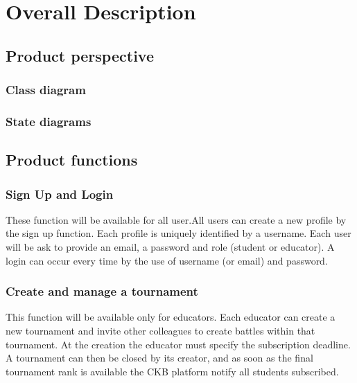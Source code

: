 \chapter{Overall Description}

\section{Product perspective}


\subsection{Class diagram}

\clearpage

\subsection{State diagrams}

\clearpage

\section{Product functions}\label{desc:prodFunc}
\subsection{Sign Up and Login}
These function will be available for all user.\newline All users can create a new profile by the sign up function. Each profile is uniquely identified by a username. Each user will be ask to provide an email, a password and role (student or educator). \newline
A login can occur every time by the use of username (or email) and password.

\subsection{Create and manage a tournament}
This function will be available only for educators. \newline Each educator can create a new tournament and invite other colleagues to create battles within that tournament. At the creation the educator must specify the subscription deadline.
A tournament can then be closed by its creator, and as soon as the final tournament rank is available the CKB platform notify all students subscribed.

